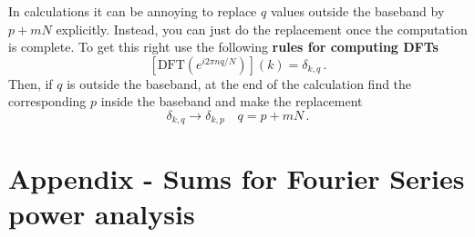 In calculations it can be annoying to replace $q$ values outside the baseband by $p+mN$ explicitly.
Instead, you can just do the replacement once the computation is complete.
To get this right use the following \textbf{rules for computing DFTs}
\begin{equation}
  \left[ \textrm{DFT}\left( e^{i2\pi nq/N} \right)\right](k) = \delta_{k,q} \, .
\end{equation}
Then, if $q$ is outside the baseband, at the end of the calculation find the corresponding $p$ inside the baseband and make the replacement
\begin{equation}
  \delta_{k,q} \rightarrow \delta_{k,p} \quad q=p+mN \, . \label{eq:aliasReplacement}
\end{equation}


\section{Appendix - Sums for Fourier Series power analysis}

